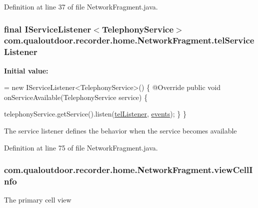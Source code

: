 Definition at line 37 of file Network\-Fragment.\-java.

\hypertarget{classcom_1_1qualoutdoor_1_1recorder_1_1home_1_1NetworkFragment_ae919499ecf136f3ed40b74f96ffbd206}{
\subsubsection[{tel\-Service\-Listener}]{\setlength{\rightskip}{0pt plus 5cm}final I\-Service\-Listener$<${\bf Telephony\-Service}$>$ com.\-qualoutdoor.\-recorder.\-home.\-Network\-Fragment.\-tel\-Service\-Listener\hspace{0.3cm}{\ttfamily [private]}}}\label{classcom_1_1qualoutdoor_1_1recorder_1_1home_1_1NetworkFragment_ae919499ecf136f3ed40b74f96ffbd206}
{\bfseries Initial value\-:}
\begin{DoxyCode}
= \textcolor{keyword}{new} IServiceListener<TelephonyService>() \{
        @Override
        \textcolor{keyword}{public} \textcolor{keywordtype}{void} onServiceAvailable(TelephonyService service) \{
            
            telephonyService.getService().listen(\hyperlink{classcom_1_1qualoutdoor_1_1recorder_1_1home_1_1NetworkFragment_ad5a2cd1711f52e14b57a04baa87c3ef4}{telListener}, \hyperlink{classcom_1_1qualoutdoor_1_1recorder_1_1home_1_1NetworkFragment_acc0a23073189e1cc9c36fe8dcafe107b}{events});
        \}
    \}
\end{DoxyCode}
The service listener defines the behavior when the service becomes available 

Definition at line 75 of file Network\-Fragment.\-java.

\hypertarget{classcom_1_1qualoutdoor_1_1recorder_1_1home_1_1NetworkFragment_a735fedd7e51ddea51f2d2461eb324763}{
\subsubsection[{view\-Cell\-Info}]{ com.\-qualoutdoor.\-recorder.\-home.\-Network\-Fragment.\-view\-Cell\-Info\hspace{0.3cm}{\ttfamily [private]}}}\label{classcom_1_1qualoutdoor_1_1recorder_1_1home_1_1NetworkFragment_a735fedd7e51ddea51f2d2461eb324763}
The primary cell view 

